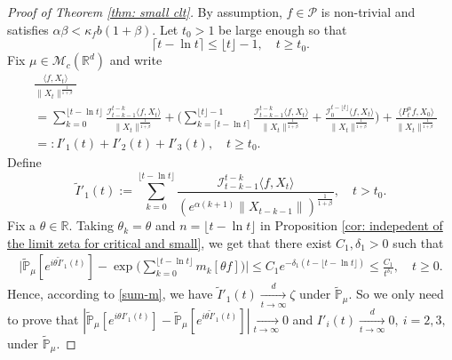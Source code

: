 \documentclass[12pt,a4paper]{amsart}
\theoremstyle{plain}
\theoremstyle{definition}
\numberwithin{equation}{section}
\begin{document}
\begin{proof}[Proof of Theorem \ref{thm: small clt}]
 By assumption, $f\in \mathcal P$ is non-trivial and satisfies $\alpha \beta < \kappa_f b(1+\beta)$.
	Let $t_0 > 1$ be large enough so that
\[
	\lceil t - \ln t\rceil
	\leq \lfloor t \rfloor - 1,
	\quad t\geq t_0.
\]
Fix $\mu\in \mathcal M_c(\mathbb R^d)$ and write
\begin{align}
	&\frac{\langle f,X_t\rangle}{\|X_t\|^{\frac{1}{1+\beta}}}
	\\&=\sum_{k=0}^{\lfloor t-\ln t \rfloor} \frac{\mathcal I_{t-k-1}^{t-k}\langle f ,X_t\rangle}{\|X_t\|^{\frac{1}{1+\beta}}}+ \Big(\sum_{k=\lceil t-\ln t \rceil}^{\lfloor t \rfloor-1} \frac{\mathcal I_{t-k-1}^{t-k}\langle f ,X_t\rangle}{\|X_t\|^{\frac{1}{1+\beta}}}+\frac{\mathcal I_0^{t-\lfloor t \rfloor}\langle f ,X_t\rangle}{\|X_t\|^{\frac{1}{1+\beta}}}\Big) +
\frac{\langle P^\alpha_t f, X_0\rangle}{\|X_t\|^{\frac{1}{1+\beta}}}
	\\&=:I'_1(t)+I'_2(t)+I'_3(t),
	\quad t\geq t_0.
\end{align}
	Define
\[
 	\widetilde I'_1(t)
 	:=\sum_{k=0}^{\lfloor t-\ln t \rfloor}\frac{\mathcal I_{t-k-1}^{t-k}\langle f ,X_t\rangle}{( e^{\alpha(k+1)}\|X_{t-k-1}\|)^{\frac{1}{1+\beta}}},
 	\quad t > t_0.
\]
    Fix a $\theta\in \mathbb R$.
    Taking $\theta_k=\theta $ and $n={\lfloor t-\ln t \rfloor}$ in Proposition \ref{cor: indepedent of the limit zeta for critical and small},
    we get that there exist $C_1,\delta_1 > 0$ such that
\begin{align}
    \Big|\mathbb{\widetilde{P}}_{\mu} [e^{i\theta\widetilde I'_1(t)} ]-\exp\Big(\sum_{k=0}^{\lfloor t-\ln t \rfloor}m_k[\theta f]\Big)\Big|
    \leq C_1 e^{-\delta_1(t - \lfloor t - \ln t\rfloor)}
    \leq \frac{C_1}{t^{\delta_1}},
    \quad t\geq 0.
\end{align}
    Hence, according to \eqref{sum-m}, we have $\widetilde I'_1(t)\xrightarrow[t\to \infty]{d} \zeta$ under $\widetilde {\mathbb P}_\mu$.
    So we only need to prove that $|\mathbb{\widetilde{P}}_{\mu}[e^{i\theta I'_1(t)}]-\mathbb{\widetilde{P}}_{\mu}[e^{i\theta\widetilde I'_1(t)}]|\xrightarrow[t\to \infty]{} 0$ and $I'_i(t)\xrightarrow[t\to \infty]{d} 0,~i=2,3,$ under $\widetilde {\mathbb P}_\mu$.


\end{proof}
\end{document}
